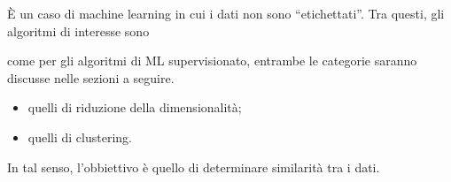 \documentclass{subfiles}
\begin{document}
\`E un caso di machine learning in cui i dati non sono ``etichettati''.
Tra questi, gli algoritmi di interesse sono
\begin{MarginNote}
    come per gli algoritmi di ML supervisionato, entrambe le categorie saranno discusse nelle sezioni a seguire.
\end{MarginNote}
\begin{itemize}
    \item quelli di riduzione della dimensionalità;
    \item quelli di clustering.
\end{itemize}
In tal senso, l'obbiettivo è quello di determinare similarità tra i dati.
\end{document}
